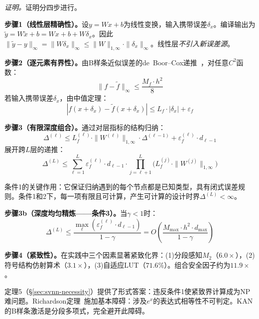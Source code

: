 \vspace{4pt}
\noindent\textit{证明。}证明分四步进行。

\textbf{步骤1（线性层精确性）。}设$y = Wx + b$为线性变换，输入携带误差$\delta_x$。编译输出为$\tilde{y} = W\tilde{x} + b = Wx + b + W\delta_x$。因此$\|\tilde{y} - y\|_\infty = \|W\delta_x\|_\infty \leq \|W\|_{1,\infty} \cdot \|\delta_x\|_\infty$。线性层\textit{不引入新误差源}。

\textbf{步骤2（逐元素有界性）。}由B样条近似误差的de~Boor--Cox递推~\cite{deBoor1978}，对任意$C^2$函数：
\begin{equation}
\|f - \tilde{f}\|_\infty \leq \frac{M_f \cdot h^2}{8}
\label{eq:de_boor_general}
\end{equation}
若输入携带误差$\delta_x$，由中值定理：
\begin{equation}
|f(x + \delta_x) - \tilde{f}(x + \delta_x)| \leq L_f \cdot |\delta_x| + \varepsilon_f
\label{eq:element_error}
\end{equation}

\textbf{步骤3（有限深度组合）。}通过对层指标的结构归纳：
\begin{equation}
\Delta^{(\ell)} \leq L_f^{(\ell)} \cdot \|W^{(\ell)}\|_{1,\infty} \cdot \Delta^{(\ell-1)} + \varepsilon_f^{(\ell)} \cdot d_{\ell-1}
\label{eq:layer_recurrence}
\end{equation}
展开跨$L$层的递推：
\begin{equation}
\Delta^{(L)} \leq \sum_{\ell=1}^{L} \varepsilon_f^{(\ell)} \cdot d_{\ell-1} \cdot \prod_{j=\ell+1}^{L} \bigl(L_f^{(j)} \cdot \|W^{(j)}\|_{1,\infty}\bigr)
\label{eq:total_bound}
\end{equation}

条件1的关键作用：它保证归纳遇到的每个节点都是已知类型，具有闭式误差规则。条件1和2下，每一项有限且可计算，产生可计算的设计时界$\Delta^{(L)} < \infty$。

\textbf{步骤3b（深度均匀精炼——条件3）。}当$\gamma < 1$时：
\begin{equation}
\Delta^{(L)} \leq \frac{\max_\ell(\varepsilon_f^{(\ell)} \cdot d_{\ell-1})}{1 - \gamma} = O\!\left(\frac{M_{\max} \cdot h^2 \cdot d_{\max}}{1-\gamma}\right)
\label{eq:convergent_bound}
\end{equation}

\textbf{步骤4（紧致性）。}在实践中三个因素显著紧致化界：(1)分段感知$M_2$（$6.0\times$），(2)符号结构仿射算术（$3.1\times$），(3)自适应LUT（$71.6\%$）。组合安全因子约为$11.9\times$。

\vspace{4pt}
\begin{remark}[SVNN条件的近似必要性]
\label{rem:near_necessity}
定理5（\S\ref{sec:svnn-necessity}）提供了形式答案：违反条件1使紧致界计算成为NP难问题。Richardson定理~\cite{richardson1969decidability}施加基本障碍：涉及$e^x$的表达式相等性不可判定。KAN的B样条激活是分段多项式，完全避开此障碍。
\end{remark}

